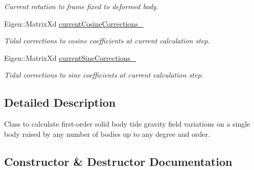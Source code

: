 \begin{DoxyCompactItemize}
\begin{DoxyCompactList}\small\item\em Current rotation to frame fixed to deformed body. \end{DoxyCompactList}\item 
Eigen\+::\+Matrix\+Xd \hyperlink{classtudat_1_1gravitation_1_1BasicSolidBodyTideGravityFieldVariations_a598b40a06e03913ae2694d0108af03fc}{current\+Cosine\+Corrections\+\_\+}\hypertarget{classtudat_1_1gravitation_1_1BasicSolidBodyTideGravityFieldVariations_a598b40a06e03913ae2694d0108af03fc}{}\label{classtudat_1_1gravitation_1_1BasicSolidBodyTideGravityFieldVariations_a598b40a06e03913ae2694d0108af03fc}

\begin{DoxyCompactList}\small\item\em Tidal corrections to cosine coefficients at current calculation step. \end{DoxyCompactList}\item 
Eigen\+::\+Matrix\+Xd \hyperlink{classtudat_1_1gravitation_1_1BasicSolidBodyTideGravityFieldVariations_ae3ef8888c89778135bd861f6b2b08bcc}{current\+Sine\+Corrections\+\_\+}\hypertarget{classtudat_1_1gravitation_1_1BasicSolidBodyTideGravityFieldVariations_ae3ef8888c89778135bd861f6b2b08bcc}{}\label{classtudat_1_1gravitation_1_1BasicSolidBodyTideGravityFieldVariations_ae3ef8888c89778135bd861f6b2b08bcc}

\begin{DoxyCompactList}\small\item\em Tidal corrections to sine coefficients at current calculation step. \end{DoxyCompactList}\end{DoxyCompactItemize}


\subsection{Detailed Description}
Class to calculate first-\/order solid body tide gravity field variations on a single body raised by any number of bodies up to any degree and order. 

\subsection{Constructor \& Destructor Documentation}
